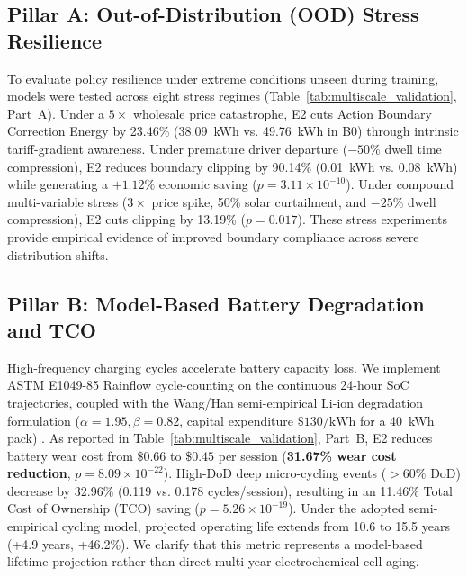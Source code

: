 \documentclass[journal]{IEEEtran}
\theoremstyle{remark}
\begin{document}
\subsection{Pillar A: Out-of-Distribution (OOD) Stress Resilience}
To evaluate policy resilience under extreme conditions unseen during training, models were tested across eight stress regimes (Table~\ref{tab:multiscale_validation}, Part~A). Under a $5\times$ wholesale price catastrophe, E2 cuts Action Boundary Correction Energy by 23.46\% (38.09~kWh vs. 49.76~kWh in B0) through intrinsic tariff-gradient awareness. Under premature driver departure ($-50\%$ dwell time compression), E2 reduces boundary clipping by 90.14\% (0.01~kWh vs. 0.08~kWh) while generating a $+1.12\%$ economic saving ($p = 3.11 \times 10^{-10}$). Under compound multi-variable stress ($3\times$ price spike, 50\% solar curtailment, and $-25\%$ dwell compression), E2 cuts clipping by 13.19\% ($p = 0.017$). These stress experiments provide empirical evidence of improved boundary compliance across severe distribution shifts.

\subsection{Pillar B: Model-Based Battery Degradation and TCO}
High-frequency charging cycles accelerate battery capacity loss. We implement ASTM E1049-85 Rainflow cycle-counting on the continuous 24-hour SoC trajectories, coupled with the Wang/Han semi-empirical Li-ion degradation formulation ($\alpha=1.95, \beta=0.82$, capital expenditure $\$130/\text{kWh}$ for a 40~kWh pack) \cite{huang2024}. As reported in Table~\ref{tab:multiscale_validation}, Part~B, E2 reduces battery wear cost from $\$0.66$ to $\$0.45$ per session (\textbf{31.67\% wear cost reduction}, $p = 8.09 \times 10^{-22}$). High-DoD deep micro-cycling events ($>60\%$ DoD) decrease by 32.96\% (0.119 vs. 0.178 cycles/session), resulting in an 11.46\% Total Cost of Ownership (TCO) saving ($p = 5.26 \times 10^{-19}$). Under the adopted semi-empirical cycling model, projected operating life extends from 10.6 to 15.5 years (+4.9 years, +46.2\%). We clarify that this metric represents a model-based lifetime projection rather than direct multi-year electrochemical cell aging.
\end{document}
